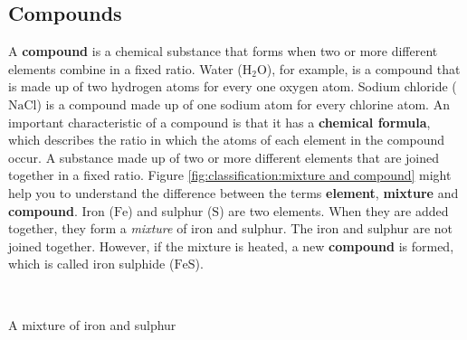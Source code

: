  
      \label{m38708*uid26}
            \subsection*{Compounds}
            \nopagebreak
 \label{m38708*id63363}A \textbf{compound} is a chemical substance that forms when two or more different elements combine in a fixed ratio. Water ($\text{H}_{2}\text{O}$), for example, is a compound that is made up of two hydrogen atoms for every one oxygen atom. Sodium chloride ($\text{NaCl}$) is a compound made up of one sodium atom for every chlorine atom. An important characteristic of a compound is that it has a \textbf{chemical formula}, which describes the ratio in which the atoms of each element in the compound occur.
 { A substance made up of two or more different elements that are joined together in a fixed ratio.} 
Figure \ref{fig:classification:mixture and compound} might help you to understand the difference between the terms \textbf{element}, \textbf{mixture} and \textbf{compound}. Iron ($\text{Fe}$) and sulphur ($\text{S}$) are two elements. When they are added together, they form a \textsl{mixture} of iron and sulphur. The iron and sulphur are not joined together. However, if the mixture is heated, a new \textbf{compound} is formed, which is called iron sulphide ($\text{FeS}$). \par 
 \begin{minipage}{.5\textwidth}
    \begin{center}
\\
\begin{caption}A mixture of iron and sulphur\end{caption}
\label{fig:classification:mixture and compound}
    \end{center}
\end{minipage}
